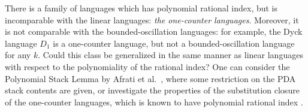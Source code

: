 \documentclass[11pt,a4paper]{article} %
\begin{document}
There is a family of languages which has polynomial rational index,
but is incomparable with the linear languages:
\emph{the one-counter languages}.
Moreover, it is not comparable with the bounded-oscillation languages:
for example, the Dyck language $D_1$ is a one-counter language,
but not a bounded-oscillation language for any $k$.
Could this class be generalized in the same manner as linear languages
with respect to the polynomiality of the rational index?
One can consider the Polynomial Stack Lemma by Afrati et al.~\cite{ChainQ},
where some restriction on the PDA stack contents are given,
or investigate the properties of the substitution closure of the one-counter languages,
which is known to have polynomial rational index \cite{RatBasic}. 

\end{document}

